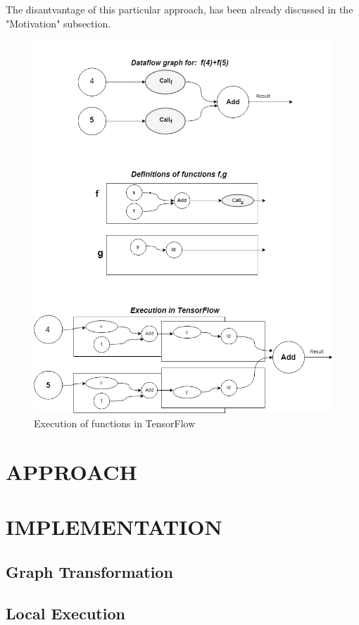 \documentclass[ack,preface]{dithesis}
\begin{document}
The disantvantage of this particular approach, has been already discussed in the "Motivation" subsection.

\begin{figure}
\centering
\includegraphics[scale=0.67]{figures/Tf_recursion}
\caption{ Execution of functions in TensorFlow}
\end{figure}


\chapter{APPROACH}

\chapter{IMPLEMENTATION}
    \section{Graph Transformation}

    \section{Local Execution}
\end{document}
